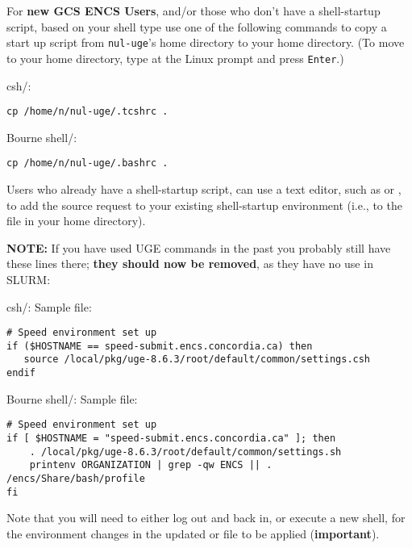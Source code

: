 For \textbf{new GCS ENCS Users}, and/or those who don't have a shell-startup script, 
based on your shell type use one of the following commands to copy a start up script 
from \texttt{nul-uge}'s home directory to your home directory. (To move to your home
directory, type  at the Linux prompt and press \texttt{Enter}.)

csh/:
\begin{verbatim}
cp /home/n/nul-uge/.tcshrc . 
\end{verbatim}

Bourne shell/:
\begin{verbatim}
cp /home/n/nul-uge/.bashrc . 
\end{verbatim}

Users who already have a shell-startup script, can use a text editor, such as
 or , to add the source request to your existing
shell-startup environment (i.e., to the  file in your home directory). 

%

\noindent
\textbf{NOTE:} If you have used UGE commands in the past you probably still have these
lines there; \textbf{they should now be removed}, as they have no use in SLURM:

csh/:
Sample  file:
\begin{verbatim}
# Speed environment set up 
if ($HOSTNAME == speed-submit.encs.concordia.ca) then
   source /local/pkg/uge-8.6.3/root/default/common/settings.csh
endif
\end{verbatim}

Bourne shell/:
Sample  file:
\begin{verbatim}
# Speed environment set up 
if [ $HOSTNAME = "speed-submit.encs.concordia.ca" ]; then
    . /local/pkg/uge-8.6.3/root/default/common/settings.sh
    printenv ORGANIZATION | grep -qw ENCS || . /encs/Share/bash/profile
fi
\end{verbatim}

Note that you will need to either log out and back in, or execute a new shell, 
for the environment changes in the updated  or  file to be applied 
(\textbf{important}).
